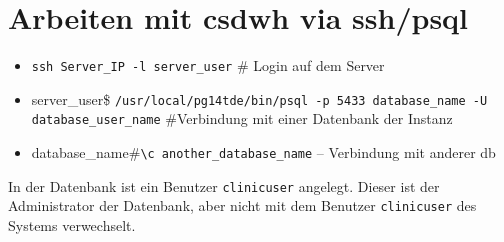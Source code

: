    \section{Arbeiten mit \acs{csdwh} via ssh/psql}
   
   \begin{itemize}
   	\item \texttt{ssh Server\_IP -l server\_user} \# Login auf dem Server
   	\item server\_user\$ \texttt{/usr/local/pg14tde/bin/psql -p 5433 database\_name -U database\_user\_name} \#Verbindung mit einer Datenbank der Instanz 
   	\item database\_name\#\texttt{\textbackslash c another\_database\_name} -- Verbindung mit anderer \ac{db}
   \end{itemize}
In der Datenbank ist ein Benutzer \texttt{clinicuser} angelegt. Dieser ist der Administrator der Datenbank, aber nicht mit dem Benutzer \texttt{clinicuser} des Systems verwechselt.
